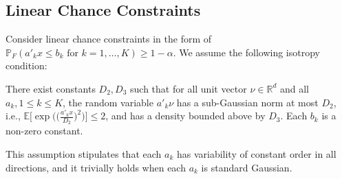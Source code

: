 \documentclass[mnsc,blindrev]{informs4} %
\newcommand{\R}{\mathbb{R}}
\begin{document}
\subsection{Linear Chance Constraints}\label{sec:CCP finite-sample}
Consider linear chance constraints in the form of $\mathbb P_F(a'_kx\leq b_k\text{ for }k=1,\ldots,K)\geq 1-\alpha$. We assume the following isotropy condition:
 \begin{assumption}[Isotropy]\label{isotropy}
 There exist constants $D_2,D_3$ such that for all unit vector $\nu\in\R^d$ and all $a_k,1\leq k\leq K$, the random variable $a'_k\nu$ has a sub-Gaussian norm at most $D_2$, i.e., $\mathbb E\big[\exp\big(\big(\frac{a'_kx}{D_2}\big)^2\big)\big]\leq 2$, and has a density bounded above by $D_3$. Each $b_k$ is a non-zero constant.
 \end{assumption}
 This assumption stipulates that each $a_k$ has variability of constant order in all directions, and it trivially holds when each $a_k$ is standard Gaussian.
\end{document}
